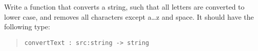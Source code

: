 \label{lowercase}
Write a function that converts a string, such that all letters
are converted to lower case, and removes all characters except
a\ldots z and space. It should have the following type:
\begin{quote}
  \mbox{\lstinline!convertText : src:string -> string!}
\end{quote}
